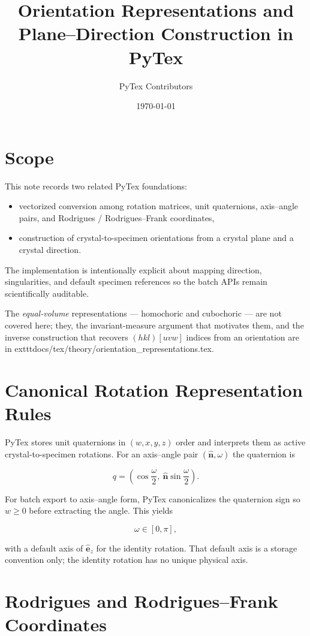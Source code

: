 \documentclass[11pt]{article}
\title{Orientation Representations and Plane--Direction Construction in PyTex}
\author{PyTex Contributors}
\date{\today}
\begin{document}
\maketitle

\section{Scope}

This note records two related PyTex foundations:

\begin{itemize}
  \item vectorized conversion among rotation matrices, unit quaternions, axis--angle pairs, and Rodrigues / Rodrigues--Frank coordinates,
  \item construction of crystal-to-specimen orientations from a crystal plane and a crystal direction.
\end{itemize}

The implementation is intentionally explicit about mapping direction, singularities, and default specimen references so the batch APIs remain scientifically auditable.

The \emph{equal-volume} representations --- homochoric and cubochoric --- are not covered here; they, the invariant-measure argument that motivates them, and the inverse construction that recovers $(hkl)[uvw]$ indices from an orientation are in 	exttt{docs/tex/theory/orientation\_representations.tex}.

\section{Canonical Rotation Representation Rules}

PyTex stores unit quaternions in $(w, x, y, z)$ order and interprets them as active crystal-to-specimen rotations. For an axis--angle pair $(\hat{\mathbf{n}}, \omega)$ the quaternion is

\[
q = \left(\cos\frac{\omega}{2},\ \hat{\mathbf{n}}\sin\frac{\omega}{2}\right).
\]

For batch export to axis--angle form, PyTex canonicalizes the quaternion sign so $w \ge 0$ before extracting the angle. This yields

\[
\omega \in [0, \pi],
\]

with a default axis of $\hat{\mathbf{e}}_z$ for the identity rotation. That default axis is a storage convention only; the identity rotation has no unique physical axis.

\section{Rodrigues and Rodrigues--Frank Coordinates}
\end{document}
